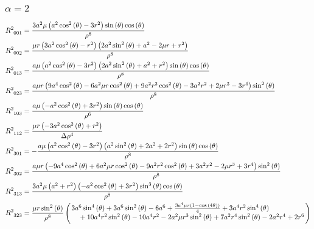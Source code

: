 \documentclass[11pt,a4paper]{article}
\begin{document}
\subsubsection*{$\alpha = 2$}
\begin{align}
R^2_{\phantom{2} 0 0 1} &= \frac{3 a^{2} \mu \left(a^{2} \cos^{2}{\left(\theta \right)} - 3 r^{2}\right) \sin{\left(\theta \right)} \cos{\left(\theta \right)}}{\rho^{8}}\\
R^2_{\phantom{2} 0 0 2} &=\frac{\mu r \left(3 a^{2} \cos^{2}{\left(\theta \right)} - r^{2}\right) \left(2 a^{2} \sin^{2}{\left(\theta \right)} + a^{2} - 2 \mu r + r^{2}\right)}{\rho^{8}}\\
R^2_{\phantom{2} 0 1 3} &=\frac{a \mu \left(a^{2} \cos^{2}{\left(\theta \right)} - 3 r^{2}\right) \left(2 a^{2} \sin^{2}{\left(\theta \right)} + a^{2} + r^{2}\right) \sin{\left(\theta \right)} \cos{\left(\theta \right)}}{\rho^{8}}\\
R^2_{\phantom{2} 0 2 3} &=\frac{a \mu r \left(9 a^{4} \cos^{2}{\left(\theta \right)} - 6 a^{2} \mu r \cos^{2}{\left(\theta \right)} + 9 a^{2} r^{2} \cos^{2}{\left(\theta \right)} - 3 a^{2} r^{2} + 2 \mu r^{3} - 3 r^{4}\right) \sin^{2}{\left(\theta \right)}}{\rho^{8}}\\
R^2_{\phantom{2} 1 0 3} &=\frac{a \mu \left(- a^{2} \cos^{2}{\left(\theta \right)} + 3 r^{2}\right) \sin{\left(\theta \right)} \cos{\left(\theta \right)}}{\rho^{6}}\\
R^2_{\phantom{2} 1 1 2} &=\frac{\mu r \left(- 3 a^{2} \cos^{2}{\left(\theta \right)} + r^{2}\right)}{\Delta \rho^{4}}\\
R^2_{\phantom{2} 3 0 1} &=- \frac{a \mu \left(a^{2} \cos^{2}{\left(\theta \right)} - 3 r^{2}\right) \left(a^{2} \sin^{2}{\left(\theta \right)} + 2 a^{2} + 2 r^{2}\right) \sin{\left(\theta \right)} \cos{\left(\theta \right)}}{\rho^{8}}\\
R^2_{\phantom{2} 3 0 2} &=\frac{a \mu r \left(- 9 a^{4} \cos^{2}{\left(\theta \right)} + 6 a^{2} \mu r \cos^{2}{\left(\theta \right)} - 9 a^{2} r^{2} \cos^{2}{\left(\theta \right)} + 3 a^{2} r^{2} - 2 \mu r^{3} + 3 r^{4}\right) \sin^{2}{\left(\theta \right)}}{\rho^{8}}\\
R^2_{\phantom{2} 3 1 3} &=\frac{3 a^{2} \mu \left(a^{2} + r^{2}\right) \left(- a^{2} \cos^{2}{\left(\theta \right)} + 3 r^{2}\right) \sin^{3}{\left(\theta \right)} \cos{\left(\theta \right)}}{\rho^{8}}\\
R^2_{\phantom{2} 3 2 3} &= \frac{\mu r\sin^{2}{\left(\theta \right)}}{\rho^{8}}\left(
\splitfrac{ 3 a^{6} \sin^{4}{\left(\theta \right)} + 3 a^{6} \sin^{2}{\left(\theta \right)} - 6 a^{6} + \frac{3 a^{4} \mu r \left(1 - \cos{\left(4 \theta \right)}\right)}{4} + 3 a^{4} r^{2} \sin^{4}{\left(\theta \right)}}{ + 10 a^{4} r^{2} \sin^{2}{\left(\theta \right)} - 10 a^{4} r^{2} - 2 a^{2} \mu r^{3} \sin^{2}{\left(\theta \right)} + 7 a^{2} r^{4} \sin^{2}{\left(\theta \right)} - 2 a^{2} r^{4} + 2 r^{6}} \right)\\
\end{align}
\end{document}
